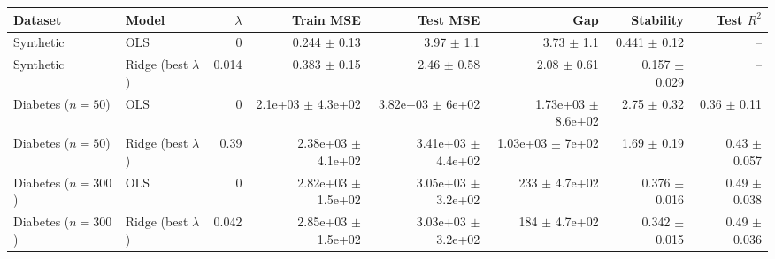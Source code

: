 \begin{tabular}{llrrrrrr}
\toprule
Dataset & Model & $\lambda$ & Train MSE & Test MSE & Gap & Stability & Test $R^2$ \\
\midrule
Synthetic & OLS & 0 & 0.244 $\pm$ 0.13 & 3.97 $\pm$ 1.1 & 3.73 $\pm$ 1.1 & 0.441 $\pm$ 0.12 & -- \\
Synthetic & Ridge (best $\lambda$) & 0.014 & 0.383 $\pm$ 0.15 & 2.46 $\pm$ 0.58 & 2.08 $\pm$ 0.61 & 0.157 $\pm$ 0.029 & -- \\
Diabetes ($n=50$) & OLS & 0 & 2.1e+03 $\pm$ 4.3e+02 & 3.82e+03 $\pm$ 6e+02 & 1.73e+03 $\pm$ 8.6e+02 & 2.75 $\pm$ 0.32 & 0.36 $\pm$ 0.11 \\
Diabetes ($n=50$) & Ridge (best $\lambda$) & 0.39 & 2.38e+03 $\pm$ 4.1e+02 & 3.41e+03 $\pm$ 4.4e+02 & 1.03e+03 $\pm$ 7e+02 & 1.69 $\pm$ 0.19 & 0.43 $\pm$ 0.057 \\
Diabetes ($n=300$) & OLS & 0 & 2.82e+03 $\pm$ 1.5e+02 & 3.05e+03 $\pm$ 3.2e+02 & 233 $\pm$ 4.7e+02 & 0.376 $\pm$ 0.016 & 0.49 $\pm$ 0.038 \\
Diabetes ($n=300$) & Ridge (best $\lambda$) & 0.042 & 2.85e+03 $\pm$ 1.5e+02 & 3.03e+03 $\pm$ 3.2e+02 & 184 $\pm$ 4.7e+02 & 0.342 $\pm$ 0.015 & 0.49 $\pm$ 0.036 \\
\bottomrule
\end{tabular}
